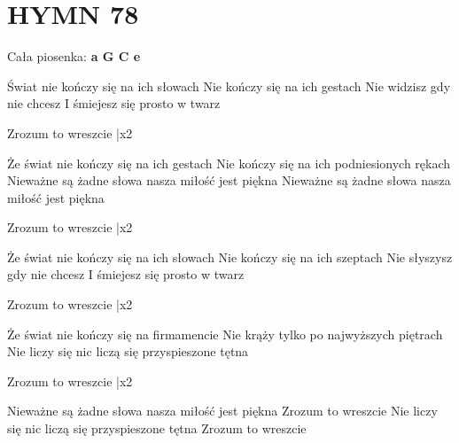 \documentclass[../../../songbook.tex]{subfiles}
\begin{document}
\TabPositions{8cm} %
\section*{HYMN 78}
{}
\vspace{0.5cm}
Cała piosenka: {\color{red}\textbf{a G C e } } \newline

Świat nie kończy się na ich słowach  \newline
Nie kończy się na ich gestach \newline
Nie widzisz gdy nie chcesz \newline
I śmiejesz się prosto w twarz \newline

\-\hspace{1cm} Zrozum to wreszcie  |x2 \newline

Że świat nie kończy się na ich gestach \newline
Nie kończy się na ich podniesionych rękach \newline
Nieważne są żadne słowa nasza miłość jest piękna \newline
Nieważne są żadne słowa nasza miłość jest piękna \newline

\-\hspace{1cm} Zrozum to wreszcie  |x2 \newline

Że świat nie kończy się na ich słowach  \newline
Nie kończy się na ich szeptach \newline
Nie słyszysz gdy nie chcesz  \newline
I śmiejesz się prosto w twarz  \newline

\-\hspace{1cm} Zrozum to wreszcie  |x2 \newline

Że świat nie kończy się na firmamencie  \newline
Nie krąży tylko po najwyższych piętrach  \newline
Nie liczy się nic liczą się przyspieszone tętna  \newline

\-\hspace{1cm} Zrozum to wreszcie  |x2 \newline

Nieważne są żadne słowa nasza miłość jest piękna \newline
Zrozum to wreszcie  \newline
Nie liczy się nic liczą się przyspieszone tętna \newline
Zrozum to wreszcie  \newline
\end{document}

